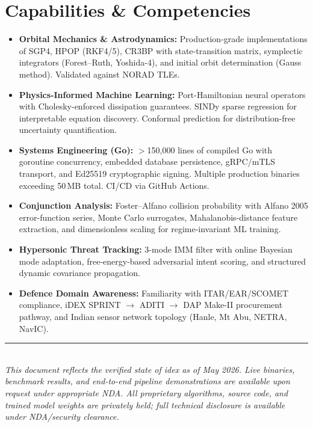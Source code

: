 \documentclass[11pt,a4paper]{article}
\begin{document}
\pagebreak

\section{Capabilities \& Competencies}

\begin{itemize}
\item \textbf{Orbital Mechanics \& Astrodynamics:} Production-grade implementations
      of SGP4, HPOP (RKF4/5), CR3BP with state-transition matrix, symplectic
      integrators (Forest--Ruth, Yoshida-4), and initial orbit determination
      (Gauss method). Validated against NORAD TLEs.

\item \textbf{Physics-Informed Machine Learning:} Port-Hamiltonian neural
      operators with Cholesky-enforced dissipation guarantees. SINDy sparse
      regression for interpretable equation discovery. Conformal prediction
      for distribution-free uncertainty quantification.

\item \textbf{Systems Engineering (Go):} $>$150,000 lines of compiled Go with
      goroutine concurrency, embedded database persistence, gRPC/mTLS transport,
      and Ed25519 cryptographic signing. Multiple production binaries exceeding
      50\,MB total. CI/CD via GitHub Actions.

\item \textbf{Conjunction Analysis:} Foster--Alfano collision probability
      with Alfano 2005 error-function series, Monte Carlo surrogates,
      Mahalanobis-distance feature extraction, and dimensionless scaling
      for regime-invariant ML training.

\item \textbf{Hypersonic Threat Tracking:} 3-mode IMM filter with
      online Bayesian mode adaptation, free-energy-based adversarial intent
      scoring, and structured dynamic covariance propagation.

\item \textbf{Defence Domain Awareness:} Familiarity with ITAR/EAR/SCOMET
      compliance, iDEX SPRINT $\to$ ADITI $\to$ DAP Make-II procurement
      pathway, and Indian sensor network topology (Hanle, Mt Abu, NETRA,
      NavIC).
\end{itemize}

\vspace{2em}
\begin{center}
\rule{0.5\textwidth}{0.4pt}\\[0.8em]
{\small\textit{This document reflects the verified state of idex as of May 2026.
Live binaries, benchmark results, and end-to-end pipeline demonstrations
are available upon request under appropriate NDA. All proprietary algorithms,
source code, and trained model weights are privately held; full technical
disclosure is available under NDA/security clearance.}}
\end{center}
\end{document}
